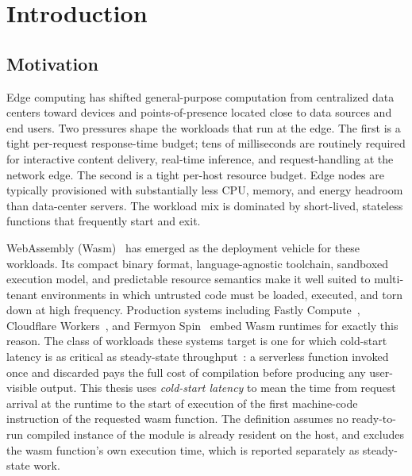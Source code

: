 
\chapter{Introduction}
\label{ch:introduction}

\section{Motivation}
\label{sec:intro:motivation}

Edge computing has shifted general-purpose computation from centralized data centers toward devices and points-of-presence located close to data sources and end users. Two pressures shape the workloads that run at the edge. The first is a tight per-request response-time budget; tens of milliseconds are routinely required for interactive content delivery, real-time inference, and request-handling at the network edge. The second is a tight per-host resource budget. Edge nodes are typically provisioned with substantially less CPU, memory, and energy headroom than data-center servers. The workload mix is dominated by short-lived, stateless functions that frequently start and exit.

WebAssembly (Wasm)~\cite{haas2017wasm,wasm-spec} has emerged as the deployment vehicle for these workloads. Its compact binary format, language-agnostic toolchain, sandboxed execution model, and predictable resource semantics make it well suited to multi-tenant environments in which untrusted code must be loaded, executed, and torn down at high frequency. Production systems including Fastly Compute~\cite{fastly-compute}, Cloudflare Workers~\cite{cloudflare-workers}, and Fermyon Spin~\cite{spin-docs} embed Wasm runtimes for exactly this reason. The class of workloads these systems target is one for which cold-start latency is as critical as steady-state throughput~\cite{gackstatter2022serverless}: a serverless function invoked once and discarded pays the full cost of compilation before producing any user-visible output. This thesis uses \emph{cold-start latency} to mean the time from request arrival at the runtime to the start of execution of the first machine-code instruction of the requested wasm function. The definition assumes no ready-to-run compiled instance of the module is already resident on the host, and excludes the wasm function's own execution time, which is reported separately as steady-state work.

